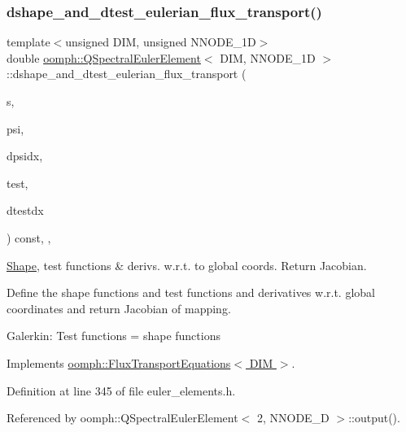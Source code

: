 \subsubsection{\texorpdfstring{dshape\+\_\+and\+\_\+dtest\+\_\+eulerian\+\_\+flux\+\_\+transport()}{dshape\_and\_dtest\_eulerian\_flux\_transport()}}
{\footnotesize\ttfamily template$<$unsigned D\+IM, unsigned N\+N\+O\+D\+E\+\_\+1D$>$ \\
double \hyperlink{classoomph_1_1QSpectralEulerElement}{oomph\+::\+Q\+Spectral\+Euler\+Element}$<$ D\+IM, N\+N\+O\+D\+E\+\_\+1D $>$\+::dshape\+\_\+and\+\_\+dtest\+\_\+eulerian\+\_\+flux\+\_\+transport (\begin{DoxyParamCaption}\item[{const \hyperlink{classoomph_1_1Vector}{Vector}$<$ double $>$ \&}]{s,  }\item[{\hyperlink{classoomph_1_1Shape}{Shape} \&}]{psi,  }\item[{\hyperlink{classoomph_1_1DShape}{D\+Shape} \&}]{dpsidx,  }\item[{\hyperlink{classoomph_1_1Shape}{Shape} \&}]{test,  }\item[{\hyperlink{classoomph_1_1DShape}{D\+Shape} \&}]{dtestdx }\end{DoxyParamCaption}) const\hspace{0.3cm}{\ttfamily [inline]}, {\ttfamily [protected]}, {\ttfamily [virtual]}}



\hyperlink{classoomph_1_1Shape}{Shape}, test functions \& derivs. w.\+r.\+t. to global coords. Return Jacobian. 

Define the shape functions and test functions and derivatives w.\+r.\+t. global coordinates and return Jacobian of mapping.

Galerkin\+: Test functions = shape functions 

Implements \hyperlink{classoomph_1_1FluxTransportEquations_a9bdf6ab17431bcac6eac11bce917cdde}{oomph\+::\+Flux\+Transport\+Equations$<$ D\+I\+M $>$}.



Definition at line 345 of file euler\+\_\+elements.\+h.



Referenced by oomph\+::\+Q\+Spectral\+Euler\+Element$<$ 2, N\+N\+O\+D\+E\+\_\+D $>$\+::output().

\mbox{\label{classoomph_1_1QSpectralEulerElement_ae3771a5f57f21d3a97595856b089e467}} 

